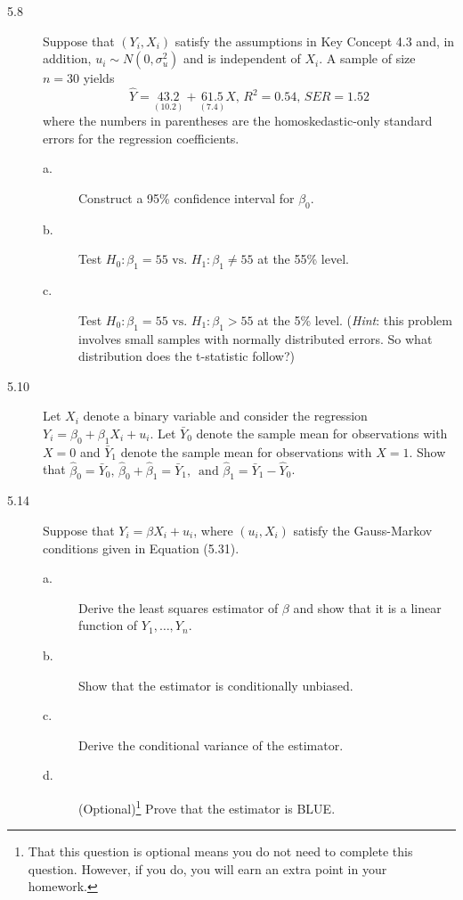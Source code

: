 \documentclass[a4paper,11pt]{article}
\begin{document}
\vspace{0.2cm}

\begin{description}
\item[{5.8}] Suppose that \((Y_i, X_i)\) satisfy the assumptions in Key
Concept 4.3 and, in addition, \(u_i \sim N(0, \sigma^2_u)\) and
is independent of \(X_i\). A sample of size \(n=30\) yields
\begin{equation*}
\hat{Y} = \underset{\displaystyle (10.2)}{43.2} + \underset{\displaystyle (7.4)}{61.5}X,\, R^2 = 0.54,\, SER = 1.52
\end{equation*}
where the numbers in parentheses are the homoskedastic-only
standard errors for the regression coefficients.
\begin{description}
\item[{a.}] Construct a 95\% confidence interval for \(\beta_0\).
\item[{b.}] Test \(H_0: \beta_1 = 55 \text{ vs. } H_1: \beta_1 \neq 55\)
at the 55\% level.
\item[{c.}] Test \(H_0: \beta_1 = 55 \text{ vs. } H_1: \beta_1 > 55\) at
the 5\% level.
(\emph{Hint}: this problem involves small samples with normally
distributed errors. So what distribution does the t-statistic
follow?)
\end{description}
\end{description}

\vspace{0.2cm}

\begin{description}
\item[{5.10}] Let \(X_i\) denote a binary variable and consider the
regression \(Y_i = \beta_0 + \beta_1 X_i + u_i\). Let
\(\bar{Y}_0\) denote the sample mean for observations with
\(X=0\) and \(\bar{Y}_1\) denote the sample mean for
observations with \(X=1\). Show that \(\hat{\beta}_0 =
          \bar{Y}_0,\, \hat{\beta}_0 + \hat{\beta}_1 = \bar{Y}_1,\,
          \text{ and } \hat{\beta}_1 = \bar{Y}_1 - \hat{Y}_0\).
\end{description}

\vspace{0.2cm}

\begin{description}
\item[{5.14}] Suppose that \(Y_i = \beta X_i + u_i\), where \((u_i, X_i)\)
satisfy the Gauss-Markov conditions given in Equation
(5.31).
\begin{description}
\item[{a.}] Derive the least squares estimator of \(\beta\) and show that
it is a linear function of \(Y_1, \ldots, Y_n\).
\item[{b.}] Show that the estimator is conditionally unbiased.
\item[{c.}] Derive the conditional variance of the estimator.
\item[{d.}] (Optional)\footnote{That this question is optional means you do not need to complete this
question. However, if you do, you will earn an extra point in your
homework.} Prove that the estimator is BLUE.
\end{description}
\end{description}
\end{document}
